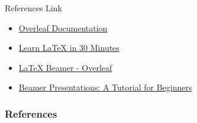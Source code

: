 \documentclass{beamer}
\begin{document}
	
	\begin{frame}{References Link}
		\begin{itemize}
			\item \href{https://www.overleaf.com/learn}{Overleaf Documentation}
			\item \href{https://www.overleaf.com/learn/latex/Learn_LaTeX_in_30_minutes}{Learn LaTeX in 30 Minutes}
			\item \href{https://www.overleaf.com/learn/latex/Beamer}{LaTeX Beamer - Overleaf}
			\item \href{https://www.overleaf.com/learn/latex/Beamer_Presentations:_A_Tutorial_for_Beginners_(Part_1)\%E2\%80\%94Getting_Started}{Beamer Presentations: A Tutorial for Beginners}
		\end{itemize}
	\end{frame}
	
	
	\begin{frame}[t, allowframebreaks]
		\frametitle{References}
		\footnotesize
		
		
	\end{frame}
	
\end{document}
